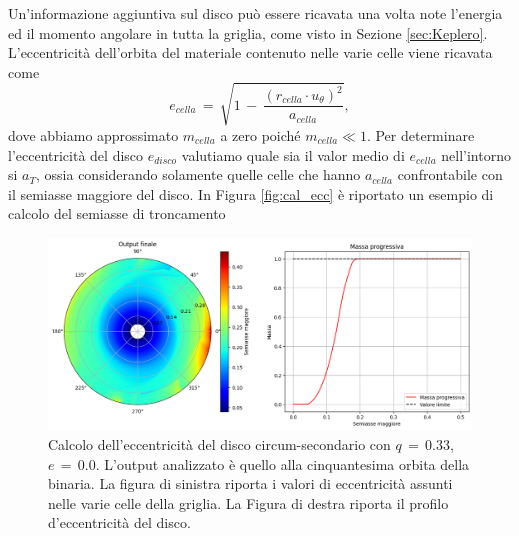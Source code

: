 Un'informazione aggiuntiva sul disco può essere ricavata una volta note l'energia ed il momento angolare in tutta la griglia, come visto in Sezione \ref{sec:Keplero}. L'eccentricità dell'orbita del materiale contenuto nelle varie celle viene ricavata come
\begin{equation}
e_{cella}\,=\,\sqrt{1\,-\,\frac{(r_{cella}\cdot u_\theta)^2}{a_{cella}}},
\label{eq:ecc_cella}
\end{equation}
dove abbiamo approssimato $m_{cella}$ a zero poiché $m_{cella} \ll 1$.
Per determinare l'eccentricità del disco $e_{disco}$ valutiamo quale sia il valor medio di $e_{cella}$ nell'intorno si $a_T$, ossia considerando solamente quelle celle che hanno $a_{cella}$ confrontabile con il semiasse maggiore del disco. In Figura \ref{fig:cal_ecc} è riportato un esempio di calcolo del semiasse di troncamento

\begin{figure}[H]
    \centering
    \includegraphics[width=\textwidth]{Immagini/Simulazioni/cal_sax.png}
    \caption{Calcolo dell'eccentricità del disco circum-secondario con $q\,=\,0.33$, $e\,=\,0.0$. L'output analizzato è quello alla cinquantesima orbita della binaria. La figura di sinistra riporta i valori di eccentricità assunti nelle varie celle della griglia. La Figura di destra riporta il profilo d'eccentricità del disco.}
    \label{fig:cal_sax}
\end{figure}